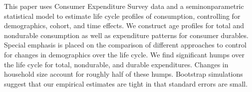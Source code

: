 This paper uses Consumer Expenditure Survey data and a seminonparametric statistical model to estimate life cycle profiles of consumption, controlling for demographics, cohort, and time effects. We construct age profiles for total and nondurable consumption as well as expenditure patterns for consumer durables. Special emphasis is placed on the comparison of different approaches to control for changes in demographics over the life cycle. We find significant humps over the life cycle for total, nondurable, and durable expenditures. Changes in household size account for roughly half of these humps. Bootstrap simulations suggest that our empirical estimates are tight in that standard errors are small.
